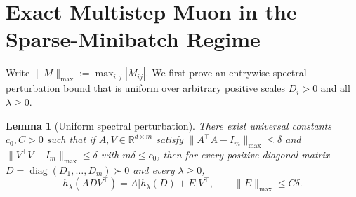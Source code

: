 \documentclass[11pt]{article}
\theoremstyle{plain}
\newtheorem{lemma}[theorem]{Lemma}
\theoremstyle{definition}
\theoremstyle{remark}
\DeclareMathOperator{\diag}{diag}
\begin{document}
\section{Exact Multistep Muon in the Sparse-Minibatch Regime}

Write $\|M\|_{\max} := \max_{i,j}|M_{ij}|$. We first prove an entrywise spectral perturbation bound that is uniform over arbitrary positive scales $D_i > 0$ and all $\lambda \ge 0$.

\begin{lemma}[Uniform spectral perturbation]\label{lem:spectral}
There exist universal constants $c_0, C > 0$ such that if $A, V \in \mathbb{R}^{d \times m}$ satisfy $\|A^\top A - I_m\|_{\max} \le \delta$ and $\|V^\top V - I_m\|_{\max} \le \delta$ with $m\delta \le c_0$, then for every positive diagonal matrix $D = \diag(D_1, \dots, D_m) \succ 0$ and every $\lambda \ge 0$,
\begin{equation}\label{eq:spectral-pert}
h_\lambda(A D V^\top) = A\bigl[h_\lambda(D) + E\bigr]V^\top,
\qquad
\|E\|_{\max} \le C\delta.
\end{equation}
\end{lemma}
\end{document}
